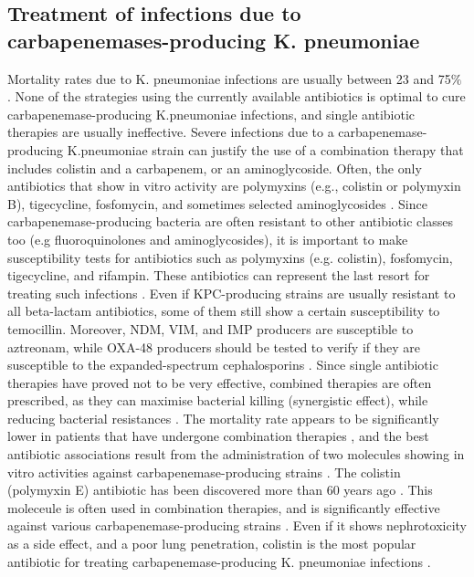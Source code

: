 \documentclass[11pt]{report}
\begin{document}
\subsection{Treatment of infections due to carbapenemases-producing K. pneumoniae}
Mortality rates due to K. pneumoniae infections are usually between 23 and 75$\%$ \cite{karaiskos2014multidrug}.
None of the strategies using the currently available antibiotics is optimal to cure carbapenemase-producing K.pneumoniae infections, and single antibiotic therapies are usually ineffective.
Severe infections due to a carbapenemase-producing K.pneumoniae strain can justify the use of a combination therapy that includes colistin and a carbapenem, or an aminoglycoside.
Often, the only antibiotics that show in vitro activity are polymyxins (e.g., colistin or polymyxin B), tigecycline, fosfomycin, and sometimes selected aminoglycosides \cite{rodriguez2015diagnosis}.
Since carbapenemase-producing bacteria are often resistant to other antibiotic classes too (e.g fluoroquinolones and aminoglycosides), it is important to make susceptibility tests for antibiotics such as polymyxins (e.g. colistin), fosfomycin, tigecycline, and rifampin.
These antibiotics can represent the last resort for treating such infections \cite{adams2009activity}.
Even if KPC-producing strains are usually resistant to all beta-lactam antibiotics, some of them still show a certain susceptibility to temocillin.
Moreover, NDM, VIM, and IMP producers are susceptible to aztreonam, while OXA-48 producers should be tested to verify if they are susceptible to the expanded-spectrum cephalosporins \cite{girlich2009ctx}.
Since single antibiotic therapies have proved not to be very effective, combined therapies are often prescribed, as they can maximise bacterial killing (synergistic effect), while reducing bacterial resistances \cite{Pitout2015}.
The mortality rate appears to be significantly lower in patients that have undergone combination therapies \cite{tzouvelekis2014treating, zavascki2013combination}, and the best antibiotic associations result from the administration of two molecules showing in vitro activities against carbapenemase-producing strains \cite{falagas2013antibiotic, tzouvelekis2014treating}.
The colistin (polymyxin E) antibiotic has been discovered more than 60 years ago \cite{karaiskos2014multidrug, rodriguez2015diagnosis}.
This moleceule is often used in combination therapies, and is significantly effective against various carbapenemase-producing strains \cite{falagas2013antibiotic, temkin2014carbapenem}.
Even if it shows nephrotoxicity as a side effect, and a poor lung penetration, colistin is the most popular antibiotic for treating carbapenemase-producing K. pneumoniae infections \cite{karaiskos2014multidrug, rodriguez2015diagnosis}.
\end{document}
